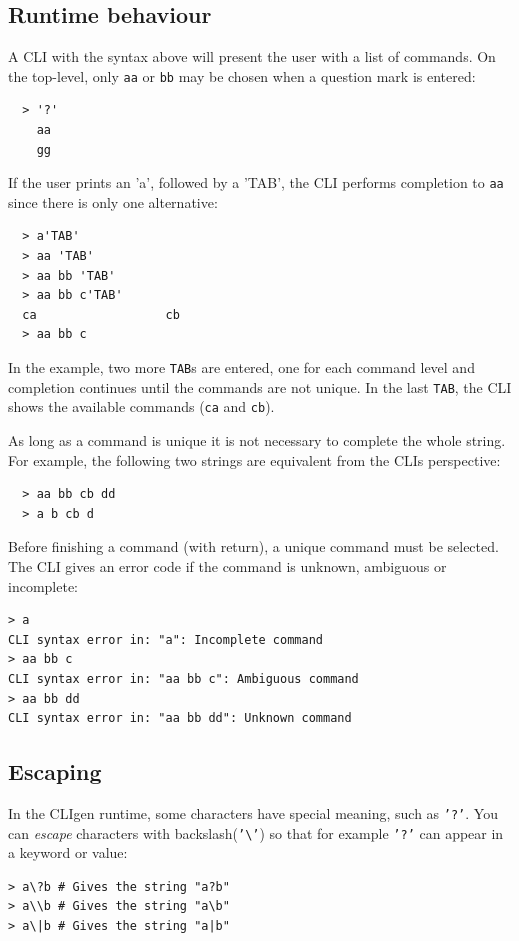 \documentclass[a4paper, 10pt] {article}
\begin{document}
\subsection{Runtime behaviour}

A CLI with the syntax above will present the user with a list of
commands. On the top-level, only {\tt aa} or {\tt bb} may be chosen when a question mark is entered:
\begin{verbatim}
  > '?'
    aa
    gg
\end{verbatim}

If the user prints an 'a', followed by a 'TAB', the CLI performs
completion to {\tt aa} since there is only one alternative:
\begin{verbatim}
  > a'TAB'
  > aa 'TAB'
  > aa bb 'TAB'
  > aa bb c'TAB'
  ca                  cb
  > aa bb c
\end{verbatim}
In the example, two more {\tt TAB}s are entered, one for each command
level and completion continues until the commands are not unique. In
the last {\tt TAB}, the CLI shows the available commands ({\tt ca} and {\tt cb}).

As long as a command is unique it is not necessary to
complete the whole string. For example, the following two strings are
equivalent from the CLIs perspective:
\begin{verbatim}
  > aa bb cb dd
  > a b cb d
\end{verbatim}

Before finishing a command (with return), a unique
command must be selected. The CLI gives an error code if the command
is unknown, ambiguous or incomplete:
\begin{verbatim}
> a
CLI syntax error in: "a": Incomplete command
> aa bb c
CLI syntax error in: "aa bb c": Ambiguous command
> aa bb dd
CLI syntax error in: "aa bb dd": Unknown command
\end{verbatim}

\subsection{Escaping}

In the CLIgen runtime, some characters have special meaning, such as
{\tt '?'}. You can \emph{escape} characters with backslash({\tt '\textbackslash'}) so
that for example {\tt '?'} can appear in a keyword or value:
\begin{verbatim}
> a\?b # Gives the string "a?b"
> a\\b # Gives the string "a\b"
> a\|b # Gives the string "a|b"
\end{verbatim}
\end{document}

